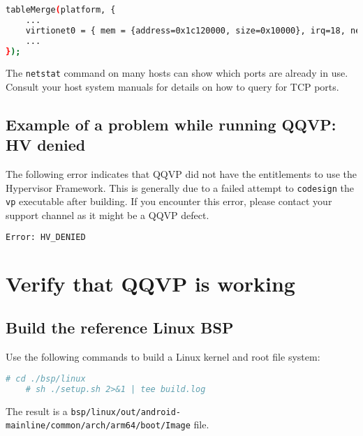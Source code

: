 {\small
\begin{lstlisting}[language=bash]
tableMerge(platform, {
    ...
    virtionet0 = { mem = {address=0x1c120000, size=0x10000}, irq=18, netdev_str="type=user,hostfwd=tcp::2222-:22,hostfwd=tcp::2221-:21,hostfwd=tcp::9998-:1919"};
    ...
});
\end{lstlisting}
\normalsize

The {\small{\lstinline!netstat!}} command on many hosts can show which
ports are already in use. Consult your host system manuals for details
on how to query for TCP ports.

\subsection{Example of a problem while running QQVP: HV denied}
\label{sec:hvDenied}

The following error indicates that QQVP did not have the entitlements to use the
Hypervisor Framework. This is generally due to a failed attempt to
{\small{\lstinline!codesign!}} the {\small{\lstinline!vp!}} executable after
building. If you encounter this error, please contact your support channel as it
might be a QQVP defect.

\small
\begin{lstlisting}[language=bash]
    Error: HV_DENIED
\end{lstlisting}
\normalsize

\clearpage
\section{Verify that QQVP is working}

\subsection{Build the reference Linux BSP}

Use the following commands to build a Linux kernel and root file system:

\small
\begin{lstlisting}[language=bash]
    # cd ./bsp/linux
    # sh ./setup.sh 2>&1 | tee build.log
\end{lstlisting}
\normalsize

The result is a {\small{\lstinline!bsp/linux/out/android-mainline/common/arch/arm64/boot/Image!}} file.



}
